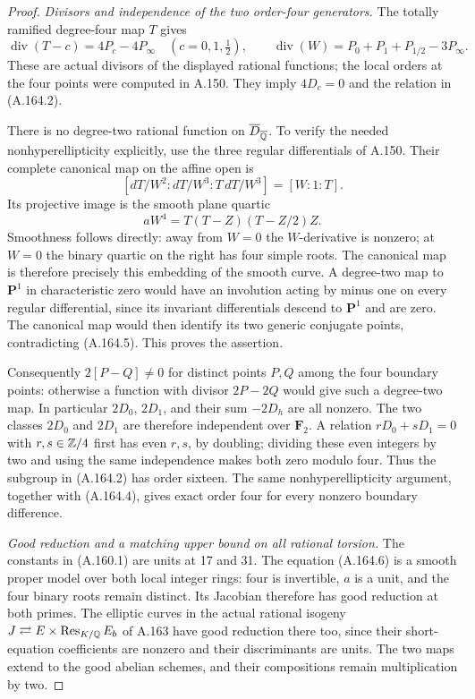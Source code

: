 \begin{proof}
\emph{Divisors and independence of the two order-four generators.}
The totally ramified degree-four map \(T\) gives
\[
 \operatorname{div}(T-c)=4P_c-4P_\infty
                 \quad(c=0,1,\tfrac12),\qquad
 \operatorname{div}(W)=P_0+P_1+P_{1/2}-3P_\infty.
\tag{A.164.4}
\]
These are actual divisors of the displayed rational
functions; the local orders at the four points were
computed in A.150.  They imply \(4D_c=0\) and
the relation in (A.164.2).

There is no degree-two rational function on
\(\overline D_{\overline{\mathbb Q}}\).  To verify the
needed nonhyperellipticity explicitly, use the
three regular differentials of A.150.  Their
complete canonical map on the affine open is
\[
        [dT/W^2:dT/W^3:T\,dT/W^3]=[W:1:T].
\tag{A.164.5}
\]
Its projective image is the smooth plane quartic
\[
                 aW^4=T(T-Z)(T-Z/2)Z.
\tag{A.164.6}
\]
Smoothness follows directly: away from \(W=0\)
the \(W\)-derivative is nonzero; at \(W=0\)
the binary quartic on the right has four simple
roots.  The canonical map is therefore precisely
this embedding of the smooth curve.  A degree-two
map to \(\mathbf P^1\) in characteristic zero
would have an involution acting by minus one on
every regular differential, since its invariant
differentials descend to \(\mathbf P^1\) and are
zero.  The canonical map would then identify its
two generic conjugate points, contradicting
(A.164.5).  This proves the assertion.

Consequently \(2[P-Q]\ne0\) for distinct points
\(P,Q\) among the four boundary points: otherwise
a function with divisor \(2P-2Q\) would give
such a degree-two map.  In particular
\(2D_0\), \(2D_1\), and their sum
\(-2D_h\) are all nonzero.  The two classes
\(2D_0\) and \(2D_1\) are therefore independent
over \(\mathbf F_2\).  A relation
\(rD_0+sD_1=0\) with \(r,s\in\mathbb Z/4\)
first has even \(r,s\), by doubling; dividing
these even integers by two and using the same
independence makes both zero modulo four.
Thus the subgroup in (A.164.2) has order sixteen.
The same nonhyperellipticity argument, together
with (A.164.4), gives exact order four for every
nonzero boundary difference.

\emph{Good reduction and a matching upper bound on all rational torsion.}
The constants in (A.160.1) are units at 17 and 31.
The equation (A.164.6) is a smooth proper model
over both local integer rings: four is invertible,
\(a\) is a unit, and the four binary roots remain
distinct.  Its Jacobian therefore has good
reduction at both primes.  The elliptic curves
in the actual rational isogeny
\(J\rightleftarrows E\times\operatorname{Res}_{K/\mathbb Q}E_b\)
of A.163 have good reduction there too, since
their short-equation coefficients are nonzero
and their discriminants are units.  The two maps
extend to the good abelian schemes, and their
compositions remain multiplication by two.


\end{proof}
